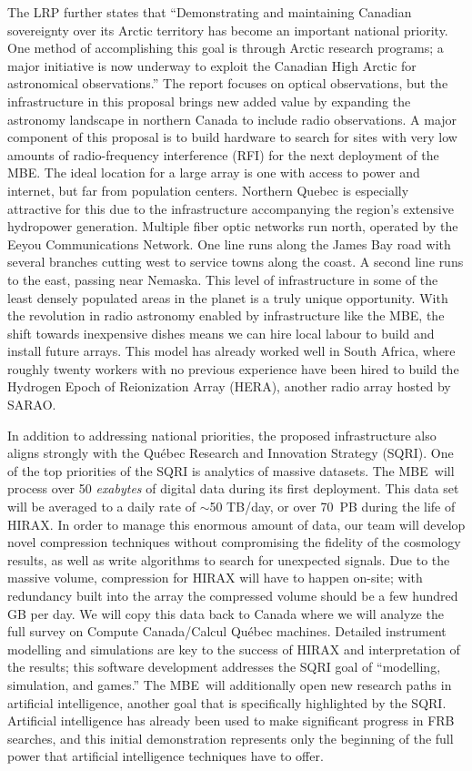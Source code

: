 \documentclass[letterpaper,11pt,preprint]{aastex}
\newcommand{\mbe}{{\rm MBE}}
\begin{document}
The LRP further states that ``Demonstrating and maintaining Canadian
sovereignty over its Arctic territory has become an important national
priority. One method of accomplishing this goal is through Arctic
research programs; a major initiative is now underway to exploit the
Canadian High Arctic for astronomical observations.''  The report
focuses on optical observations, but the infrastructure in this
proposal brings new added value by expanding the astronomy landscape
in northern Canada to include radio observations.  A major component
of this proposal is to build hardware to search for sites with very
low amounts of radio-frequency interference (RFI) for the next
deployment of the \mbe.  The ideal location for a large array is one
with access to power and internet, but far from population centers.
Northern Quebec is especially attractive for this due to the
infrastructure accompanying the region's extensive hydropower
generation.  Multiple fiber optic networks run north, operated by the
Eeyou Communications Network.  One line runs along the James Bay road
with several branches cutting west to service towns along the coast.
A second line runs to the east, passing near Nemaska.  This level of
infrastructure in some of the least densely populated areas in the
planet is a truly unique opportunity.  With the revolution in radio
astronomy enabled by infrastructure like the \mbe, the shift towards
inexpensive dishes means we can hire local labour to build and install
future arrays.  This model has already worked well in South Africa,
where roughly twenty workers with no previous experience have been
hired to build the Hydrogen Epoch of Reionization Array (HERA),
another radio array hosted by SARAO.

In addition to addressing national priorities, the proposed
infrastructure also aligns strongly with the Qu\'ebec Research and
Innovation Strategy (SQRI).  One of the top priorities of the SQRI is
analytics of massive datasets.  The \mbe\ will process over 50 {\it
  exabytes} of digital data during its first deployment.  This data
set will be averaged to a daily rate of $\sim$50 TB/day, or over 70~PB
during the life of HIRAX.  In order to manage this enormous amount of
data, our team will develop novel compression techniques without
compromising the fidelity of the cosmology results, as well as write
algorithms to search for unexpected signals.  Due to the massive
volume, compression for HIRAX will have to happen on-site; with
redundancy built into the array the compressed volume should be a few
hundred GB per day.  We will copy this data back to Canada where we
will analyze the full survey on Compute Canada/Calcul Qu\'ebec machines.
Detailed instrument modelling and simulations are key to the success
of HIRAX and interpretation of the results; this software development
addresses the SQRI goal of ``modelling, simulation, and games.''  The
\mbe\ will additionally open new research paths in artificial
intelligence, another goal that is specifically highlighted by the
SQRI.  Artificial intelligence has already been used to make
significant progress in FRB searches, and this initial demonstration
represents only the beginning of the full power that artificial
intelligence techniques have to offer.
\end{document}
